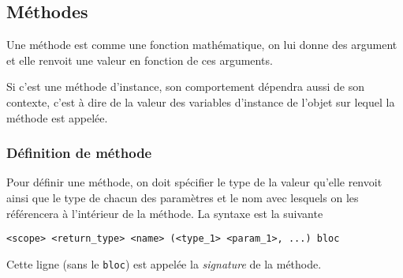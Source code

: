 \subsection{Méthodes}
Une méthode est comme une fonction mathématique, on lui donne des
argument et elle renvoit une valeur en fonction de ces arguments.

Si c'est une méthode d'instance, son comportement dépendra aussi de son
contexte, c'est à dire de la valeur des variables d'instance de l'objet
sur lequel la méthode est appelée.

\subsubsection{Définition de méthode}
Pour définir une méthode, on doit spécifier le type de la valeur
qu'elle renvoit ainsi que le type de chacun des paramètres et le nom
avec lesquels on les référencera à l'intérieur de la méthode.
La syntaxe est la suivante
\begin{lstlisting}
<scope> <return_type> <name> (<type_1> <param_1>, ...) bloc
\end{lstlisting}
Cette ligne (sans le \lstinline|bloc|) est appelée
la \emph{signature} de la méthode.
